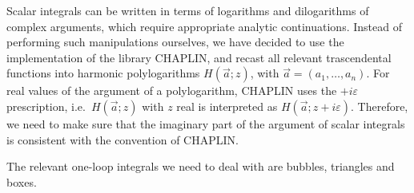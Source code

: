 \documentclass[12pt,a4wide]{article}
\begin{document}
Scalar integrals can be written in terms of logarithms and dilogarithms of complex
arguments, which require appropriate analytic continuations. Instead of performing such manipulations ourselves, we have
decided to use the implementation of the library CHAPLIN, and recast all relevant trascendental
functions into harmonic polylogarithms $H(\vec a;z)$, with
$\vec a=(a_1,\dots,a_n)$. For real values of the argument of a polylogarithm, CHAPLIN
uses the $+i\varepsilon$ prescription, i.e.\ $H(\vec a;z)$ with $z$
real is interpreted as $H(\vec a;z+i\varepsilon)$. Therefore, we need
to make sure that the imaginary part of the argument of scalar
integrals is consistent with the convention of CHAPLIN.

The relevant one-loop integrals we need to deal with are  
bubbles, triangles and boxes.
\end{document}

